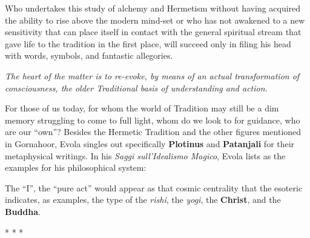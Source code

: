 \begin{quotex}
Who undertakes this study of alchemy and Hermetism without having acquired the ability to rise above the modern mind-set or who has not awakened to a new sensitivity that can place itself in contact with the general spiritual stream that gave life to the tradition in the first place, will succeed only in filing his head with words, symbols, and fantastic allegories.

\emph{The heart of the matter is to re-evoke, by means of an actual transformation of consciousness, the older Traditional basis of understanding and action.}
\end{quotex}


For those of us today, for whom the world of Tradition may still be a dim memory struggling to come to full light, whom do we look to for guidance, who are our ``own''? Besides the Hermetic Tradition and the other figures mentioned in Gornahoor, Evola singles out specifically \textbf{Plotinus} and \textbf{Patanjali} for their metaphysical writings. In his \emph{Saggi sull'Idealismo Magico}, Evola lists as the examples for his philosophical system:

\begin{quotex}
The ``I'', the ``pure act'' would appear as that cosmic centrality that the esoteric indicates, as examples, the type of the \emph{rishi}, the
\emph{yogi}, the \textbf{Christ}, and the \textbf{Buddha}.
\end{quotex}




\begin{center}* * *\end{center}

